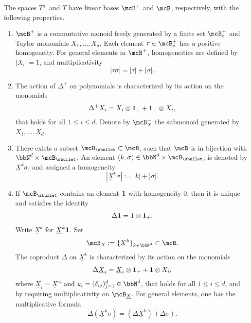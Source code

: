 \begin{assumption}\label{ass:A}
The spaces $T^+$ and $T$ have linear bases $\mcB^+$ and $\mcB$, respectively, with the following properties.
\begin{enumerate}
\item\label{ass:A1} $\mcB^+$ is a commutative monoid freely generated by a finite set $\mcB_\circ^+$ and Taylor monomials $X_1,\dots,X_d$.
Each element $\tau\in\mcB_\circ^+$ has a positive homogeneity. For general elements in $\mcB^+$, homogeneities are defined by $|X_i|=1$, and multiplicativity
\[
|\tau\sigma|=|\tau|+|\sigma|.
\]

\item\label{ass:A2} The action of $\Delta^+$ on polynomials is characterized by its action on the monomials
\begin{equation} \label{EqPreLeibniz}
\Delta^+X_i = X_i\otimes {\bf 1}_+ + {\bf 1}_+\otimes X_i,
\end{equation}
that holds for all $1\leq i\leq d$. Denote by $\mcB_X^+$ the submonoid generated by $X_1,\dots,X_d$.

\item\label{ass:A3} There exists a subset $\mcB_\sbullet\subset\mcB$, such that $\mcB$ is in bijection with $\bbN^d\times\mcB_\sbullet$. An element $(k,\sigma)\in\bbN^d\times\mcB_\sbullet$, is denoted by $\underline{X}^k\sigma$, and assigned a homogeneity
\[
|\underline{X}^k\sigma| := |k|+|\sigma|.
\]

\item\label{ass:A4} If $\mcB_\sbullet$ contains an element ${\bf 1}$ with homogeneity $0$, then it is unique and satisfies the identity
\[
\Delta{\bf 1} = {\bf 1}\otimes{\bf 1}_+.
\]
Write $\underline{X}^k$ for $\underline{X}^k{\bf1}$. Set
\[
\mcB_{\underline{X}} := \{\underline{X}^k\}_{k\in\bbN^d}\subset\mcB.
\]
The coproduct $\Delta$ on $\underline{X}^k$ is characterized by its action on the monomials
\[
\Delta \underline{X}_i = \underline{X}_i\otimes {\bf 1}_+ + {\bf 1}\otimes X_i,
\]
where $\underline{X}_i=\underline{X}^{e_i}$ and $e_i=(\delta_{ij})_{j=1}^d\in\bbN^d$, that holds for all $1\leq i\leq d$, and by requiring multiplicativity on $\mcB_{\underline{X}}$. For general elements, one has the multiplicative formula
\[
\Delta(\underline{X}^k\sigma) = (\Delta \underline{X}^k)\,(\Delta\sigma).
\]
\end{enumerate}
\end{assumption}


